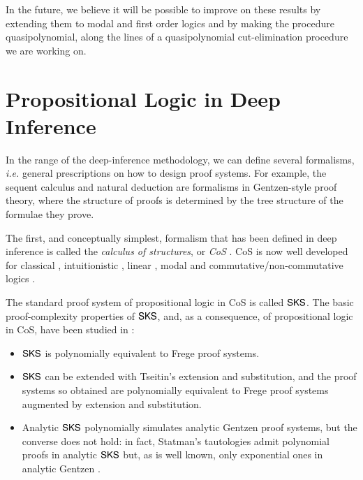 \documentclass[a4paper]{amsart}
\theoremstyle{definition}
\theoremstyle{remark}
\begin{document}
In the future, we believe it will be possible to improve on these results by extending them to modal \cite{Brun:07:Deep-Seq:fk,HeinStew:05:Purity-T:tg,StewStou:05:A-System:tg,Stou:06:A-Deep-I:rt} and first order \cite{Brun:04:Deep-Inf:rq,Brun:06:Cut-Elim:cq} logics and by making the procedure quasipolynomial, along the lines of a quasipolynomial cut-elimination procedure we are working on.

\section{Propositional Logic in Deep Inference}\label{SectDI}

In the range of the deep-inference methodology, we can define several formalisms, \emph{i.e.} general prescriptions on how to design proof systems. For example, the sequent calculus and natural deduction are formalisms in Gentzen-style proof theory, where the structure of proofs is determined by the tree structure of the formulae they prove.

The first, and conceptually simplest, formalism that has been defined in deep inference is called the \emph{calculus of structures}, or \emph{CoS} \cite{Gugl:06:A-System:kl}. CoS is now well developed for classical \cite{Brun:03:Atomic-C:oz,Brun:06:Cut-Elim:cq,Brun:06:Locality:zh,BrunTiu:01:A-Local-:mz,Brun:06:Deep-Inf:qy}, intuitionistic \cite{Tiu:06:A-Local-:gf}, linear \cite{Stra:02:A-Local-:ul,Stra:03:MELL-in-:oy}, modal \cite{Brun::Deep-Seq:ay,GoreTiu:06:Classica:uq,Stou:06:A-Deep-I:rt} and com\-mu\-ta\-tive/non-commutative logics \cite{Gugl:06:A-System:kl,Tiu:06:A-System:ai,Stra:03:Linear-L:lp,Brus:02:A-Purely:wd,Di-G:04:Structur:wy,GuglStra:01:Non-comm:rp,GuglStra:02:A-Non-co:lq,GuglStra:02:A-Non-co:dq,Kahr:06:Reducing:hc,Kahr:07:System-B:fk}.

The standard proof system of propositional logic in CoS is called $\mathsf{SKS}$. The basic proof-complexity properties of $\mathsf{SKS}$, and, as a consequence, of propositional logic in CoS, have been studied in \cite{BrusGugl:07:On-the-P:fk}:
\begin{itemize}
\item $\mathsf{SKS}$ is polynomially equivalent to Frege proof systems.
\item $\mathsf{SKS}$ can be extended with Tseitin's extension and substitution, and the proof systems so obtained are polynomially equivalent to Frege proof systems augmented by extension and substitution.
\item Analytic $\mathsf{SKS}$ polynomially simulates analytic Gentzen proof systems, but the converse does not hold: in fact, Statman's tautologies admit polynomial proofs in analytic $\mathsf{SKS}$ but, as is well known, only exponential ones in analytic Gentzen \cite{Stat:78:Bounds-f:fj}.
\end{itemize}
\end{document}
